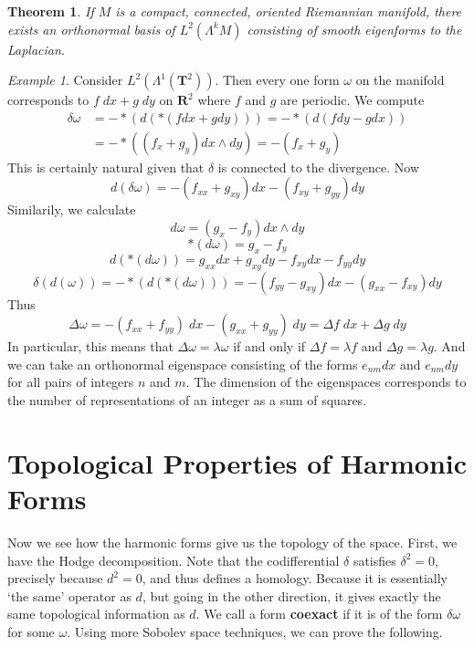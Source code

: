 \documentclass{article}
\theoremstyle{plain}
\newtheorem{theorem}{Theorem}
\theoremstyle{remark}
\newtheorem*{example}{Example}
\theoremstyle{definition}
\begin{document}
\begin{theorem}
    If $M$ is a compact, connected, oriented Riemannian manifold, there exists an orthonormal basis of $L^2(\Lambda^k M)$ consisting of smooth eigenforms to the Laplacian.
\end{theorem}

\begin{example}
    Consider $L^2(\Lambda^1(\mathbf{T}^2))$. Then every one form $\omega$ on the manifold corresponds to $f\; dx + g\; dy$ on $\mathbf{R}^2$ where $f$ and $g$ are periodic. We compute
    \begin{align*}
        \delta \omega &= - *(d(* (fdx + gdy))) = - *(d(f dy - g dx))\\
        &= - * \left( ( f_x + g_y) dx \wedge dy \right) = -(f_x + g_y)
    \end{align*}
    This is certainly natural given that $\delta$ is connected to the divergence. Now
    \[ d(\delta \omega) = - (f_{xx} + g_{xy}) dx - (f_{xy} + g_{yy}) dy \]
    Similarily, we calculate
    \[ d\omega = (g_x - f_y) dx \wedge dy \]
    \[ *(d \omega) = g_x - f_y \]
    \[ d(*(d \omega)) = g_{xx} dx + g_{xy} dy - f_{xy} dx - f_{yy} dy \]
    \[ \delta(d(\omega)) = - *(d(*(d \omega))) = - (f_{yy} - g_{xy}) dx - (g_{xx} - f_{xy}) dy \]
    Thus
    \[ \Delta \omega = - (f_{xx} + f_{yy})\; dx - (g_{xx} + g_{yy})\; dy = \Delta f\; dx + \Delta g\; dy \]
    In particular, this means that $\Delta \omega = \lambda \omega$ if and only if $\Delta f = \lambda f$ and $\Delta g = \lambda g$. And we can take an orthonormal eigenspace consisting of the forms $e_{nm} dx$ and $e_{nm} dy$ for all pairs of integers $n$ and $m$. The dimension of the eigenspaces corresponds to the number of representations of an integer as a sum of squares. 
\end{example}

\section{Topological Properties of Harmonic Forms}

Now we see how the harmonic forms give us the topology of the space. First, we have the Hodge decomposition. Note that the codifferential $\delta$ satisfies $\delta^2 = 0$, precisely because $d^2 = 0$, and thus defines a homology. Because it is essentially `the same' operator as $d$, but going in the other direction, it gives exactly the same topological information as $d$. We call a form {\bf coexact} if it is of the form $\delta \omega$ for some $\omega$. Using more Sobolev space techniques, we can prove the following.
\end{document}
